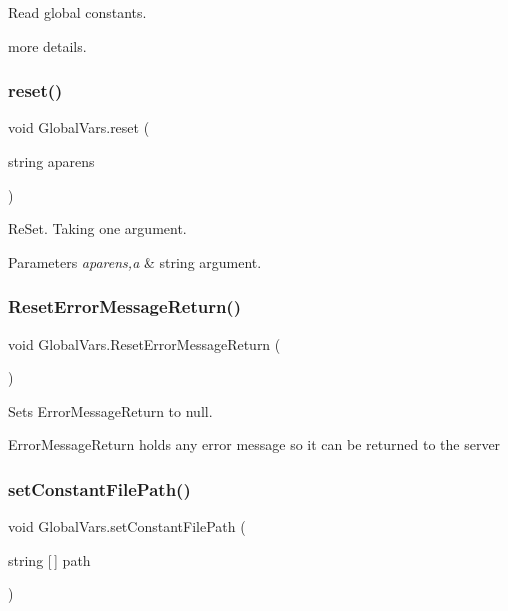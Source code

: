 Read global constants. 

more details. \mbox{\label{class_global_vars_a76cfa6a2f43f92c148c8abf8664122f0}} 
\subsubsection{\texorpdfstring{reset()}{reset()}}
{\footnotesize\ttfamily void Global\+Vars.\+reset (\begin{DoxyParamCaption}\item[{string}]{aparens }\end{DoxyParamCaption})\hspace{0.3cm}{\ttfamily [inline]}}



Re\+Set. Taking one argument. 


\begin{DoxyParams}{Parameters}
{\em aparens,a} & string argument. \\
\hline
\end{DoxyParams}
\mbox{\label{class_global_vars_a5388dae8764cf038368193b867e881b2}} 
\subsubsection{\texorpdfstring{ResetErrorMessageReturn()}{ResetErrorMessageReturn()}}
{\footnotesize\ttfamily void Global\+Vars.\+Reset\+Error\+Message\+Return (\begin{DoxyParamCaption}{ }\end{DoxyParamCaption})\hspace{0.3cm}{\ttfamily [inline]}}



Sets Error\+Message\+Return to null. 

Error\+Message\+Return holds any error message so it can be returned to the server \mbox{\label{class_global_vars_a5fc99c8171c0e838561fe0e85778588a}} 
\subsubsection{\texorpdfstring{setConstantFilePath()}{setConstantFilePath()}}
{\footnotesize\ttfamily void Global\+Vars.\+set\+Constant\+File\+Path (\begin{DoxyParamCaption}\item[{string \mbox{[}$\,$\mbox{]}}]{path }\end{DoxyParamCaption})\hspace{0.3cm}{\ttfamily [inline]}}



